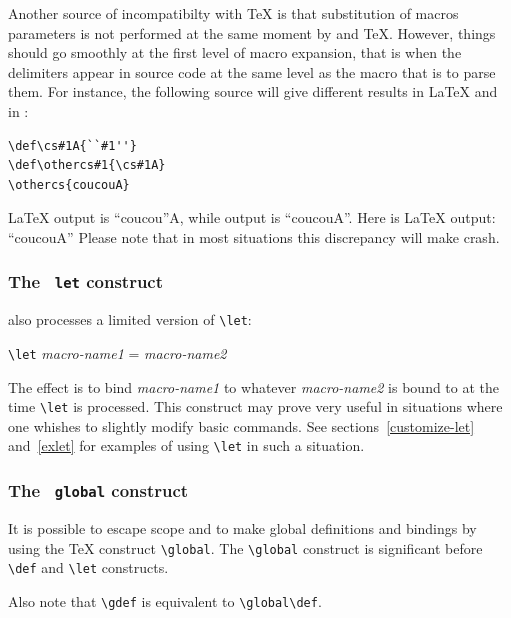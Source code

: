 Another source of incompatibilty with \TeX{} is that  substitution of
macros parameters is not performed at the same moment by \hevea{} and
\TeX{}.
However, things should go smoothly at the first level of macro
expansion, that is when the delimiters
appear in source code at the same level as the macro that is to
parse them.
For instance, the following source will give different results in
\LaTeX{} and in \hevea:
\begin{verbatim}
\def\cs#1A{``#1''}
\def\othercs#1{\cs#1A}
\othercs{coucouA}
\end{verbatim}
\LaTeX{} output is ``coucou''A, while \hevea{} output is ``coucouA''.
Here is \ifhevea\hevea\else\LaTeX\fi{} output:
{\def\cs#1A{``#1''}
\def\othercs#1{\cs#1A}
\othercs{coucouA}}
Please note that in most situations this discrepancy will make
\hevea{} crash. 


\subsubsection{The \texttt{ let} construct}
\hevea{} also processes a
limited version of \verb+\let+:
\begin{flushleft}
\verb+\let+ {\it macro-name1} = {\it macro-name2}
\end{flushleft}
The effect is to bind  {\it macro-name1} to whatever {\it macro-name2}
is bound to at the time \verb+\let+ is processed. This construct may
prove very useful in situations where
one whishes to slightly modify basic commands.
See sections~\ref{customize-let} and~\ref{exlet} for examples of using
\verb+\let+ in such a situation.




\subsubsection{The \texttt{ global} construct}
It is possible to escape scope and to make global definitions
and bindings by using the \TeX{} construct \verb+\global+.
The \verb+\global+ construct is significant before
\verb+\def+ and \verb+\let+ constructs.

Also note that \verb+\gdef+ is equivalent to \verb+\global\def+.


